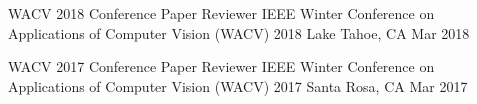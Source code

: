 

\begin{cventries} %


  \cventryshort %
    {WACV 2018 Conference Paper Reviewer} %
    {IEEE Winter Conference on Applications of Computer Vision (WACV) 2018} %
    {Lake Tahoe, CA} %
    {Mar 2018} %

  \cventryshort %
    {WACV 2017 Conference Paper Reviewer} %
    {IEEE Winter Conference on Applications of Computer Vision (WACV) 2017} %
    {Santa Rosa, CA} %
    {Mar 2017} %


\end{cventries} %
